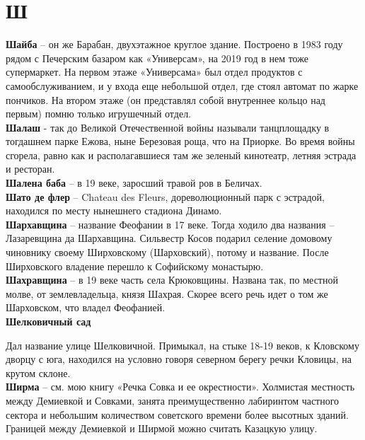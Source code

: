 \chapter*{Ш}

\textbf{Шайба} – он же Барабан, двухэтажное круглое здание. Построено в 1983 году рядом с Печерским базаром как «Универсам», на 2019 год в нем тоже супермаркет. На первом этаже «Универсама» был отдел продуктов с самообслуживанием, и у входа еще небольшой отдел, где стоял автомат по жарке пончиков. На втором этаже (он представлял собой внутреннее кольцо над первым) помню только игрушечный отдел.\\

\textbf{Шалаш} - так до Великой Отечественной войны называли танцплощадку в тогдашнем парке Ежова, ныне Березовая роща, что на Приорке. Во время войны сгорела, равно как и располагавшиеся там же зеленый кинотеатр, летняя эстрада и ресторан.\\

\textbf{Шалена баба} – в 19 веке, заросший травой ров в Беличах.\\

\textbf{Шато де флер} – Chateau des Fleurs, дореволюционный парк с эстрадой, находился по месту нынешнего стадиона Динамо.\\ 

\textbf{Шархавщина} – название Феофании в 17 веке. Тогда ходило два названия – Лазаревщина да Шархавщина. Сильвестр Косов подарил селение домовому чиновнику своему Ширховскому (Шарховский), потому и название. После Ширховского владение перешло к Софийскому монастырю.\\

\textbf{Шахравщина} – в 19 веке часть села Крюковщины. Названа так, по местной молве, от землевладельца, князя Шахрая. Скорее всего речь идет о том же Шарховском, что владел Феофанией.\\

\textbf{Шелковичный сад}

Дал название улице Шелковичной. Примыкал, на стыке 18-19 веков, к Кловскому дворцу с юга, находился на условно говоря северном берегу речки Кловицы, на крутом склоне.\\

\textbf{Ширма} – см. мою книгу «Речка Совка и ее окрестности». Холмистая местность между Демиевкой и Совками, занята преимущественно лабиринтом частного сектора и небольшим количеством советского времени более высотных зданий. Границей между Демиевкой и Ширмой можно считать Казацкую улицу.\\

